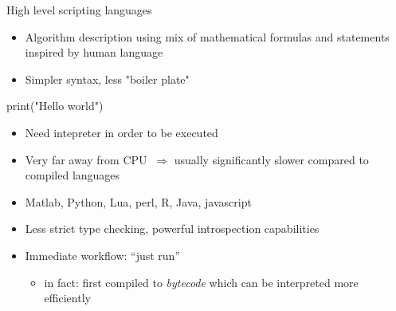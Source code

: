 \begin{frame}[fragile]{High level scripting languages}

  \begin{itemize}
    \tightlist
  \item
    Algorithm description using mix of mathematical formulas and
    statements inspired by human language
  \item 
    Simpler syntax, less "boiler plate"
  \end{itemize}

  \begin{pythoncode}
    print("Hello world")
  \end{pythoncode}

  \begin{itemize}
    \tightlist
  \item
    Need intepreter in order to be executed
  \item
    Very far away from CPU \(~\Rightarrow\) usually significantly slower
    compared to compiled languages
  \item
    Matlab, Python, Lua, perl, R, Java, javascript
  \item
    Less strict type checking, powerful introspection
    capabilities
  \item
    Immediate workflow: ``just run''

    \begin{itemize}
      \tightlist
    \item
      in fact: first compiled to \emph{bytecode} which can be interpreted
      more efficiently
    \end{itemize}
  \end{itemize}


\end{frame}

